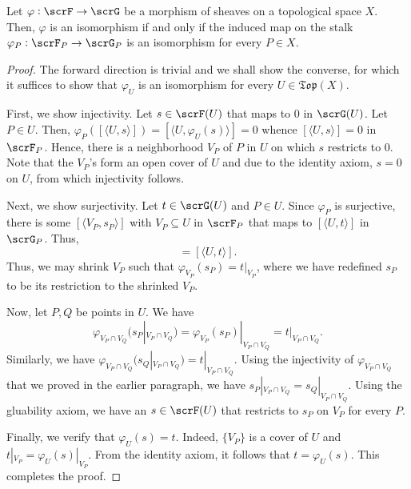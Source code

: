\begin{theorem}
    Let $\varphi:\scrF\to\scrG$ be a morphism of sheaves on a topological space $X$. Then, $\varphi$ is an isomorphism if and only if the induced map on the stalk $\varphi_P:\scrF_P\to\scrG_P$ is an isomorphism for every $P\in X$.
\end{theorem}
\begin{proof}
    The forward direction is trivial and we shall show the converse, for which it suffices to show that $\varphi_U$ is an isomorphism for every $U\in\mathfrak{Top}(X)$. 

    First, we show injectivity. Let $s\in\scrF(U)$ that maps to $0$ in $\scrG(U)$. Let $P\in U$. Then, $\varphi_P([\langle U, s\rangle]) = [\langle U, \varphi_U(s)\rangle] = 0$ whence $[\langle U, s\rangle] = 0$ in $\scrF_P$. Hence, there is a neighborhood $V_P$ of $P$ in $U$ on which $s$ restricts to $0$. Note that the $V_P$'s form an open cover of $U$ and due to the identity axiom, $s = 0$ on $U$, from which injectivity follows. 

    Next, we show surjectivity. Let $t\in\scrG(U)$ and $P\in U$. Since $\varphi_P$ is surjective, there is some $[\langle V_P, s_P\rangle]$ with $V_P\subseteq U$ in $\scrF_P$ that maps to $[\langle U, t\rangle]$ in $\scrG_P$. Thus, 
    \begin{equation*}
        [\langle V_P, \varphi_{V_P}(s_P)\rangle] = [\langle U, t\rangle].
    \end{equation*}
    Thus, we may shrink $V_P$ such that $\varphi_{V_P}(s_P) = t|_{V_P}$, where we have redefined $s_P$ to be its restriction to the shrinked $V_P$.

    Now, let $P, Q$ be points in $U$. We have 
    \begin{equation*}
        \varphi_{V_P\cap V_Q}(s_P|_{V_P\cap V_Q}) = \varphi_{V_P}(s_P)|_{V_P\cap V_Q} = t|_{V_P\cap V_Q}.
    \end{equation*}
    Similarly, we have $\varphi_{V_P\cap V_Q}(s_Q|_{V_P\cap V_Q}) = t|_{V_P\cap V_Q}$. Using the injectivity of $\varphi_{V_P\cap V_Q}$ that we proved in the earlier paragraph, we have $s_P|_{V_P\cap V_Q} = s_Q|_{V_P\cap V_Q}$. Using the gluability axiom, we have an $s\in\scrF(U)$ that restricts to $s_P$ on $V_P$ for every $P$.

    Finally, we verify that $\varphi_U(s) = t$. Indeed, $\{V_P\}$ is a cover of $U$ and $t|_{V_P} = \varphi_{U}(s)|_{V_P}$. From the identity axiom, it follows that $t = \varphi_U(s)$. This completes the proof.
\end{proof}

